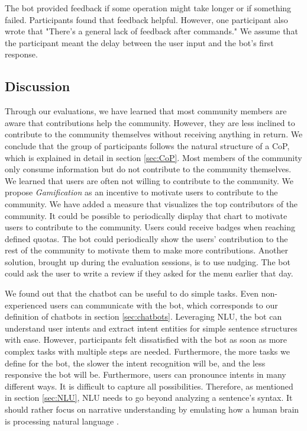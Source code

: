 The bot provided feedback if some operation might take longer or if something failed. Participants found that feedback helpful. However, one participant also wrote that "There's a general lack of feedback after commands." We assume that the participant meant the delay between the user input and the bot's first response.  

\subsection{Discussion}
Through our evaluations, we have learned that most community members are aware that contributions help the community. However, they are less inclined to contribute to the community themselves without receiving anything in return. 
We conclude that the group of participants follows the natural structure of a CoP, which is explained in detail in section \ref{sec:CoP}. Most members of the community only consume information but do not contribute to the community themselves. We learned that users are often not willing to contribute to the community. We propose \emph{Gamification} as an incentive to motivate users to contribute to the community.
We have added a measure that visualizes the top contributors of the community. It could be possible to periodically display that chart to motivate users to contribute to the community.
Users could receive badges when reaching defined quotas. The bot could periodically show the users' contribution to the rest of the community to motivate them to make more contributions.
Another solution, brought up during the evaluation sessions, is to use nudging. The bot could ask the user to write a review if they asked for the menu earlier that day.

We found out that the chatbot can be useful to do simple tasks. Even non-experienced users can communicate with the bot, which corresponds to our definition of chatbots in section \ref{sec:chatbots}. Leveraging NLU, the bot can understand user intents and extract intent entities for simple sentence structures with ease. However,  participants felt dissatisfied with the bot as soon as more complex tasks with multiple steps are needed. Furthermore, the more tasks we define for the bot, the slower the intent recognition will be, and the less responsive the bot will be. 
Furthermore, users can pronounce intents in many different ways. It is difficult to capture all possibilities.
Therefore, as mentioned in section \ref{sec:NLU}, NLU needs to go beyond analyzing a sentence's syntax. It should rather focus on narrative understanding by emulating how a human brain is processing natural language \cite{CaWh14}.